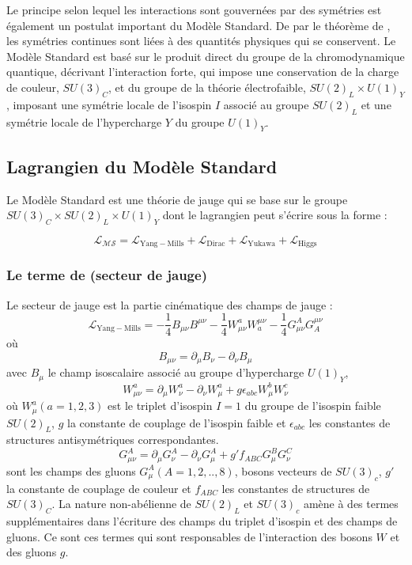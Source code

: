 Le principe selon lequel les interactions sont gouvernées par des symétries est également un postulat important du Modèle Standard. De par le théorème de , les symétries continues sont liées à des quantités physiques qui se conservent. Le Modèle Standard est basé sur le produit direct du groupe de la chromodynamique quantique, décrivant l'interaction forte, qui impose une conservation de la charge de couleur, $SU(3)_{C}$, et du groupe de la théorie électrofaible, $SU(2)_{L} \times U(1)_{Y}$, imposant une symétrie locale de l'isospin $I$ associé au groupe $SU(2)_{L}$ et une symétrie locale de l'hypercharge $Y$ du groupe $U(1)_{Y}$.

\subsection{Lagrangien du Modèle Standard}
Le Modèle Standard est une théorie de jauge qui se base sur le groupe $SU(3)_{C} \times SU(2)_{L} \times U(1)_{Y}$ dont le lagrangien peut s'écrire sous la forme :

\begin{equation}
\mathcal{L_{MS}}=\mathcal{L}_{\mathrm{Yang-Mills}}+\mathcal{L}_{\mathrm{Dirac}}+\mathcal{L}_{\mathrm{Yukawa}}+\mathcal{L}_{\mathrm{Higgs}}
\end{equation}

\subsubsection{Le terme de  (secteur de jauge)}
Le secteur de jauge est la partie cinématique des champs de jauge :
\begin{equation}
\mathcal{L}_{\mathrm{Yang-Mills}}=-\frac{1}{4}B_{\mu\nu}B^{\mu\nu}-\frac{1}{4}W_{\mu\nu}^{a}W_{a}^{\mu\nu}-\frac{1}{4}G_{\mu\nu}^{A}G_{A}^{\mu\nu}
\end{equation}
où 
\begin{equation}
B_{\mu\nu}=\partial_{\mu}B_{\nu}-\partial_{\nu}B_{\mu}
\end{equation}
avec $B_{\mu}$ le champ isoscalaire associé au groupe d'hypercharge $U(1)_{Y}$,
\begin{equation}
W_{\mu\nu}^{a}=\partial_{\mu}W_{\nu}^{a}-\partial_{\nu}W_{\mu}^{a}+g\epsilon_{abc}W_{\mu}^{b}W_{\nu}^{c}
\end{equation}
où $W_{\mu}^{a} (a=1,2,3)$ est le triplet d'isospin $I=\num{1}$ du groupe de l'isospin faible $SU(2)_{L}$, $g$ la constante de couplage de l'isospin faible et $\epsilon_{abc}$ les constantes de structures antisymétriques correspondantes.  
\begin{equation}
G_{\mu\nu}^{A}=\partial_{\mu}G_{\nu}^{A}-\partial_{\nu}G_{\mu}^{A}+g'f_{ABC}G_{\mu}^{B}G_{\nu}^{C}
\end{equation}
sont les champs des gluons $G_{\mu}^{A} (A=1,2,..,8)$, bosons vecteurs de $SU(3)_{c}$, $g'$ la constante de couplage de couleur et $f_{ABC}$ les constantes de structures de $SU(3)_{C}$.
La nature non-abélienne de $SU(2)_{L}$ et $SU(3)_{c}$ amène à des termes supplémentaires dans l'écriture des champs du triplet d'isospin et des champs de gluons. Ce sont ces termes qui sont responsables de l'interaction des bosons $W$ et des gluons $g$.

